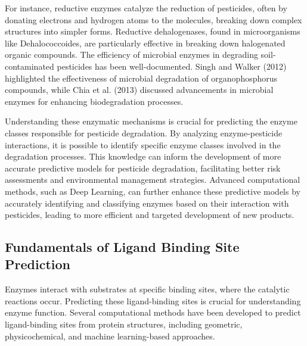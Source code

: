 For instance, reductive enzymes catalyze the reduction of pesticides, often by donating electrons and hydrogen atoms to the molecules, breaking down complex structures into simpler forms. Reductive dehalogenases, found in microorganisms like Dehalococcoides, are particularly effective in breaking down halogenated organic compounds. The efficiency of microbial enzymes in degrading soil-contaminated pesticides has been well-documented. Singh and Walker (2012) \autocite{singhMicrobialDegradationOrganophosphorus2006} highlighted the effectiveness of microbial degradation of organophosphorus compounds, while Chia et al. (2013) \autocite{chiaFunctionMicrobialEnzymes2024} discussed advancements in microbial enzymes for enhancing biodegradation processes.

Understanding these enzymatic mechanisms is crucial for predicting the enzyme classes responsible for pesticide degradation. By analyzing enzyme-pesticide interactions, it is possible to identify specific enzyme classes involved in the degradation processes. This knowledge can inform the development of more accurate predictive models for pesticide degradation, facilitating better risk assessments and environmental management strategies. Advanced computational methods, such as Deep Learning, can further enhance these predictive models by accurately identifying and classifying enzymes based on their interaction with pesticides, leading to more efficient and targeted development of new products.

\subsection{Fundamentals of Ligand Binding Site Prediction}
\label{sec:Fundamentals of Ligand Binding Site Prediction}

Enzymes interact with substrates at specific binding sites, where the catalytic reactions occur. Predicting these ligand-binding sites is crucial for understanding enzyme function. Several computational methods have been developed to predict ligand-binding sites from protein structures, including geometric, physicochemical, and machine learning-based approaches.

